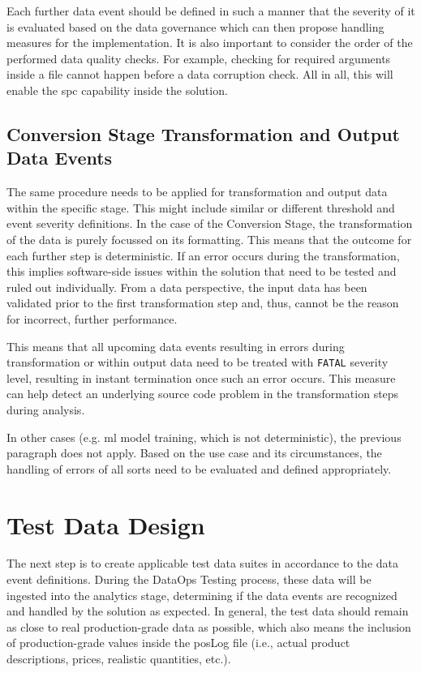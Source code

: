 Each further data event should be defined in such a manner that the severity of it is evaluated based on the data governance which can then propose handling measures for the implementation. It is also important to consider the order of the performed data quality checks. For example, checking for required arguments inside a file cannot happen before a data corruption check. All in all, this will enable the \ac{spc} capability inside the solution.

\subsection{Conversion Stage Transformation and Output Data Events}
The same procedure needs to be applied for transformation and output data within the specific stage. This might include similar or different threshold and event severity definitions. In the case of the Conversion Stage, the transformation of the data is purely focussed on its formatting. This means that the outcome for each further step is deterministic. If an error occurs during the transformation, this implies software-side issues within the solution that need to be tested and ruled out individually. From a data perspective, the input data has been validated prior to the first transformation step and, thus, cannot be the reason for incorrect, further performance.

This means that all upcoming data events resulting in errors during transformation or within output data need to be treated with \texttt{FATAL} severity level, resulting in instant termination once such an error occurs. This measure can help detect an underlying source code problem in the transformation steps during analysis.

In other cases (e.g. \acs{ml} model training, which is not deterministic), the previous paragraph does not apply. Based on the use case and its circumstances, the handling of errors of all sorts need to be evaluated and defined appropriately.

\section{Test Data Design}
The next step is to create applicable test data suites in accordance to the data event definitions. During the DataOps Testing process, these data will be ingested into the analytics stage, determining if the data events are recognized and handled by the solution as expected. In general, the test data should remain as close to real production-grade data as possible, which also means the inclusion of production-grade values inside the \ac{pos}Log file (i.e., actual product descriptions, prices, realistic quantities, etc.).

